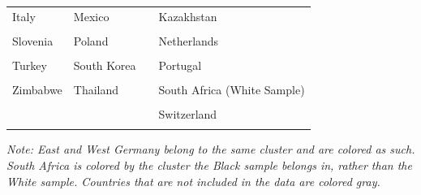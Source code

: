 \documentclass[
]{article}
\begin{document}
\begin{table}[h]
\begin{tabular}[t]{>{}l>{}l>{}l>{}l}
\textcolor[HTML]{739999}{Italy} & \textcolor[HTML]{000026}{Mexico} & \textcolor[HTML]{407326}{} & \textcolor[HTML]{BF7300}{Kazakhstan}\\
\textcolor[HTML]{739999}{\cellcolor{gray!6}{Philippines}} & \textcolor[HTML]{000026}{\cellcolor{gray!6}{Nigeria}} & \textcolor[HTML]{407326}{\cellcolor{gray!6}{}} & \textcolor[HTML]{BF7300}{\cellcolor{gray!6}{Namibia}}\\
\textcolor[HTML]{739999}{Slovenia} & \textcolor[HTML]{000026}{Poland} & \textcolor[HTML]{407326}{} & \textcolor[HTML]{BF7300}{Netherlands}\\
\textcolor[HTML]{739999}{\cellcolor{gray!6}{Spain}} & \textcolor[HTML]{000026}{\cellcolor{gray!6}{Russia}} & \textcolor[HTML]{407326}{\cellcolor{gray!6}{}} & \textcolor[HTML]{BF7300}{\cellcolor{gray!6}{New Zealand}}\\
\addlinespace
\textcolor[HTML]{739999}{Turkey} & \textcolor[HTML]{000026}{South Korea} & \textcolor[HTML]{407326}{} & \textcolor[HTML]{BF7300}{Portugal}\\
\textcolor[HTML]{739999}{\cellcolor{gray!6}{Zambia}} & \textcolor[HTML]{000026}{\cellcolor{gray!6}{Taiwan}} & \textcolor[HTML]{407326}{\cellcolor{gray!6}{}} & \textcolor[HTML]{BF7300}{\cellcolor{gray!6}{Singapore}}\\
\textcolor[HTML]{739999}{Zimbabwe} & \textcolor[HTML]{000026}{Thailand} & \textcolor[HTML]{407326}{} & \textcolor[HTML]{BF7300}{South Africa (White Sample)}\\
\textcolor[HTML]{739999}{\cellcolor{gray!6}{}} & \textcolor[HTML]{000026}{\cellcolor{gray!6}{Venezuela}} & \textcolor[HTML]{407326}{\cellcolor{gray!6}{}} & \textcolor[HTML]{BF7300}{\cellcolor{gray!6}{Sweden}}\\
\textcolor[HTML]{739999}{} & \textcolor[HTML]{000026}{} & \textcolor[HTML]{407326}{} & \textcolor[HTML]{BF7300}{Switzerland}\\
\addlinespace
\textcolor[HTML]{739999}{\cellcolor{gray!6}{}} & \textcolor[HTML]{000026}{\cellcolor{gray!6}{}} & \textcolor[HTML]{407326}{\cellcolor{gray!6}{}} & \textcolor[HTML]{BF7300}{\cellcolor{gray!6}{USA}}\\
\bottomrule
\end{tabular}
\end{table}

\emph{Note: East and West Germany belong to the same cluster and are
colored as such. South Africa is colored by the cluster the Black sample
belongs in, rather than the White sample. Countries that are not
included in the data are colored gray.}
\end{document}
